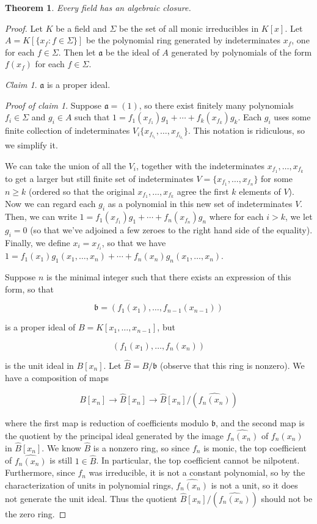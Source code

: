 \documentclass{amsart}
\newtheorem{theorem}{Theorem}
\begin{document}
\begin{theorem}
Every field has an algebraic closure.
\end{theorem}

\begin{proof}
Let $ K$ be a field and $ \Sigma$ be the set of all monic irreducibles in $ K[x]$. Let $ A = K[\{x_f : f \in \Sigma\}]$ be the polynomial ring generated by indeterminates $ x_f$, one for each $ f \in \Sigma$. Then let $ \mathfrak{a}$ be the ideal of $ A$ generated by polynomials of the form $ f(x_f)$ for each $ f \in \Sigma$.

\emph{Claim 1}. $ \mathfrak{a}$ is a proper ideal.

\emph{Proof of claim 1}. Suppose $ \mathfrak{a} = (1)$, so there exist finitely many polynomials $ f_i \in \Sigma$ and $ g_i \in A$ such that $ 1 = f_1(x_{f_1}) g_1 + \dotsb + f_k(x_{f_k}) g_k$. Each $ g_i$ uses some finite collection of indeterminates $ V_i \{x_{f_{i_1}}, \dotsc, x_{f_{i_{k_i}}}\}$. This notation is ridiculous, so we simplify it.

We can take the union of all the $ V_i$, together with the indeterminates $ x_{f_1}, \dotsc, x_{f_k}$ to get a larger but still finite set of indeterminates $ V = \{x_{f_1}, \dotsc, x_{f_n}\}$ for some $ n \geq k$ (ordered so that the original $ x_{f_1}, \dotsc, x_{f_k}$ agree the first $ k$ elements of $ V$). Now we can regard each $ g_i$ as a polynomial in this new set of indeterminates $ V$.
Then, we can write $ 1 = f_1(x_{f_1}) g_1 + \dotsb + f_n(x_{f_n}) g_n$ where for each $ i > k$, we let $ g_i = 0$ (so that we've adjoined a few zeroes to the right hand side of the equality).
Finally, we define $ x_i = x_{f_i}$, so that we have
$ 1 = f_1(x_1)g_1(x_1, \dotsc, x_n) + \dotsb + f_n(x_n) g_n(x_1, \dotsc, x_n)$.

Suppose $ n$ is the minimal integer such that there exists an expression of this form, so that

\[ \mathfrak{b} = (f_1(x_1), \dotsc, f_{n-1}(x_{n-1})) \]

is a proper ideal of $ B = K[x_1, \dotsc, x_{n-1}]$, but

\[ (f_1(x_1), \dotsc, f_n(x_n)) \]

is the unit ideal in $ B[x_n]$. Let $ \hat{B} = B/\mathfrak{b}$ (observe that this ring is nonzero). We have a composition of maps

\[ B[x_n] \to \hat{B}[x_n] \to \hat{B}[x_n]/(\widehat{f_n(x_n)}) \]

where the first map is reduction of coefficients modulo $ \mathfrak{b}$, and the second map is the quotient by the principal ideal generated by the image $ \widehat{f_n(x_n)}$ of $ f_n(x_n)$ in $ \hat{B}[x_n]$. We know $ \hat{B}$ is a nonzero ring, so since $ f_n$ is monic, the top coefficient of $ \widehat{f_n(x_n)}$ is still $ 1 \in \hat{B}$. In particular, the top coefficient cannot be nilpotent. Furthermore, since $ f_n$ was irreducible, it is not a constant polynomial, so by the characterization of units in polynomial rings, $ \widehat{f_n(x_n)}$ is not a unit, so it does not generate the unit ideal. Thus the quotient $ \hat{B}[x_n]/(\widehat{f_n(x_n)})$ should not be the zero ring.


\end{proof}
\end{document}
